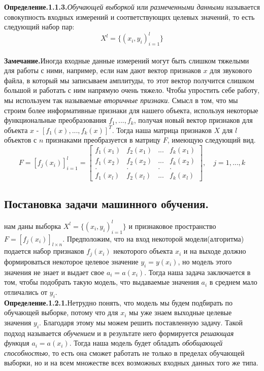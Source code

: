 \documentclass[a4paper,12pt]{article}
\begin{document}
\noindent\textbf{Определение.1.1.3.}\textit{Обучающей выборкой} или \textit{размеченными данными} называется совокупность входных измерений и соответствующих целевых значений, то есть следующий набор пар:
\begin{equation*}
    X^l = \{(x_i, y_i)_{i=1}^l\}
\end{equation*}\\

\noindent\textbf{Замечание.}Иногда входные данные измерений могут быть слишком тяжелыми для работы с ними, например, если нам дают вектор признаков $x$ для звукового файла, в который мы записываем амплитуды, то этот вектор получится слишком большой и работать с ним напрямую очень тяжело. Чтобы упростить себе работу, мы используем так называемые \textit{вторичные признаки}. Смысл в том, что мы строим более информативные признаки для нашего объекта, используя некоторые функциональные преобразования $f_1, ..., f_k$, получая новый вектор признаков для объекта $x$ - $[f_1(x), ..., f_k(x)]^T$. Тогда наша матрица признаков $X$ для $l$ объектов с $n$ признаками преобразуется в матрицу $F$, имеющую следующий вид.
\begin{equation*}
    F = [f_j(x_i)]_{i=1}^l =
    \begin{bmatrix}
        f_1(x_1) & f_2(x_1) & ... & f_k(x_1) \\
        f_1(x_2) & f_2(x_2) & ... & f_k(x_2) \\
        . & . & . & .\\
        f_1(x_l) & f_2(x_l) & ... & f_k(x_l)
    \end{bmatrix},\quad j=1,...,k
\end{equation*}

\newpage
\subsection{Постановка задачи машинного обучения.}
 нам даны выборка $X^l = \{(x_i,y_i)_{i=1}^l\}$ и признаковое пространство $F = [f_j(x_i)]_{l\times n}$. Предположим, что на вход некоторой модели(алгоритма) подается набор признаков $f_j(x_i)$ некоторого объекта $x_i$ и на выходе должно формироваться некоторое целевое значение $y_i=y(x_i)$, но модель этого значения не знает и выдает свое $a_i=a(x_i)$. Тогда наша задача заключается в том, чтобы подобрать такую модель, что выдаваемые значения $a_i$ в среднем мало отличались от $y_i$.\\

\noindent\textbf{Определение.1.2.1.}Нетрудно понять, что модель мы будем подбирать по обучающей выборке, потому что для $x_i$ мы уже знаем выходные целевые значения $y_i$. Благодаря этому мы можем решить поставленную задачу. Такой подход называется \textit{обучением} и в результате него формируется \textit{решающая функция} $a_i=a(x_i)$. Тогда наша модель будет обладать \textit{обобщающей способностью}, то есть она сможет работать не только в пределах обучающей выборки, но и на всем множестве всех возможных входных данных того же типа.\\
\end{document}
